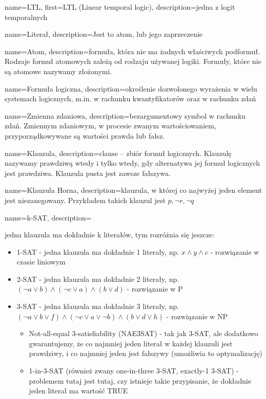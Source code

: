  {
    name=LTL,
    first={LTL (Linear temporal logic)},
    description={jedna z logit temporalnych}
}

 {
    name=Literał,
    description={Jest to atom, lub jego zaprzeczenie}
}

 {
    name=Atom,
    description={formuła, która nie ma żadnych właściwych podformuł. Rodzaje formuł atomowych zależą od rodzaju używanej logiki.
    Formuły, które nie są atomowe nazywamy złożonymi. }
}

 {
    name={Formuła logiczna},
    description={określenie dozwolonego wyrażenia w wielu systemach logicznych, m.in. w rachunku kwantyfikatorów oraz w rachunku zdań}
}

 {
    name=Zmienna zdaniowa,
    description={bezargumentowy symbol w rachunku zdań. Zmiennym zdaniowym, w procesie zwanym wartościowaniem, przyporządkowywane są wartości prawda lub fałsz.}
}

 {
    name=Klauzula,
    description={clause – zbiór formuł logicznych. Klauzulę nazywamy prawdziwą wtedy i tylko wtedy, gdy alternatywa jej formuł logicznych jest prawdziwa. Klauzula pusta jest zawsze fałszywa. }
}

 {
    name=Klauzula Horna,
    description={klauzula, w której co najwyżej jeden element jest niezanegowany. Przykładem takich klauzul jest ${p,\neg r,\neg q}$ }
}

 {
    name=k-SAT,
    description={jedna klauzula ma dokładnie k literałów, tym rozróżnia się jeszcze:
\begin{itemize}
    \item 1-SAT - jedna klauzula ma dokładnie 1 literały, np. $x \land y\land c$ - rozwiązanie w czasie liniowym
    \item 2-SAT - jedna klauzula ma dokładnie 2 literały, np. $(\neg a\lor b)\land (\neg c\lor a)\land (b\lor d)$ - rozwiązanie w P
    \item 3-SAT - jedna klauzula ma dokładnie 3 literały, np. $(\neg a\lor b\lor f)\land (\neg c\lor a\lor \neg b)\land (b\lor d\lor h)$ - rozwiązanie w NP 
    \begin{itemize}
    \item Not-all-equal 3-satisfiability (NAE3SAT) - tak jak 3-SAT, ale dodatkowo gwarantujemy, że co najmniej jeden literał w każdej klauzuli jest prawdziwy, i co najmniej jeden jest fałszywy (umożliwia to optymalizację)
    \item 1-in-3-SAT (również zwany one-in-three 3-SAT, exactly-1 3-SAT) - problemem tutaj jest tutaj, czy istnieje takie przypisanie, że dokładnie jeden literał ma wartość TRUE
    \end{itemize}
\end{itemize}
    }
}

